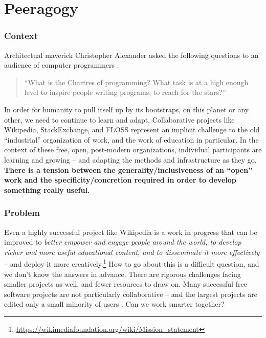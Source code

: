 \section{Peeragogy}\label{sec:Peeragogy}

\subsubsection*{Context}  Architectual maverick Christopher Alexander asked the following questions to an audience of computer programmers \cite{alexander1999origins}: 
\begin{quote}
``What is the Chartres of programming? What task is at a high enough level to inspire people writing programs, to reach for the stars?''
\end{quote}
In order for humanity to pull itself up by its bootstraps, on this planet or any other, we need to continue to learn and adapt.  Collaborative projects like Wikipedia, StackExchange, and FLOSS represent an implicit challenge to the old ``industrial'' organization of work, and the work of education in particular.  In the context of these free, open, post-modern organizations, individual participants are learning and growing -- and adapting the methods and infrastructure as they go.
\textbf{There is a tension between the generality/inclusiveness of an ``open'' work and the specificity/concretion required in order to develop something really useful.}

\subsubsection*{Problem} Even a highly successful project like Wikipedia is a work in progress that can be improved to \emph{\emph{better} empower and engage people around the world, to develop \emph{richer and more useful} educational content, and to disseminate it \emph{more} effectively} -- and deploy it more creatively.\footnote{\url{https://wikimediafoundation.org/wiki/Mission_statement}}  How to go about this is a difficult question, and we don't know the answers in advance.  There are rigorous challenges facing smaller projects as well, and fewer resources to draw on.  Many successful free software projects are not particularly collaborative -- and the largest projects are edited only a small minority of users \cite{free-software-better,who-writes-wikipedia}.  Can we work smarter together?

